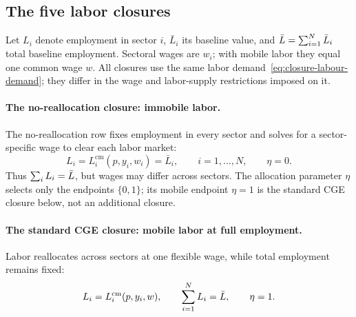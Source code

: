 \subsection{The five labor closures}\label{app:labour-closures}

Let $L_i$ denote employment in sector $i$, $\bar{L}_i$ its baseline value,
and $\bar{L} = \sum_{i=1}^N \bar{L}_i$ total baseline employment. Sectoral
wages are $w_i$; with mobile labor they equal one common wage $w$. All
closures use the same labor demand~\eqref{eq:closure-labour-demand}; they
differ in the wage and labor-supply restrictions imposed on it.

\paragraph{The no-reallocation closure: immobile labor.}
The no-reallocation row fixes employment in every sector and solves for a
sector-specific wage to clear each labor market:
\begin{equation}
L_i = L_i^{\mathrm{cm}}(p,y_i,w_i) = \bar{L}_i,
\qquad i=1,\ldots,N, \qquad \eta = 0.
\label{eq:closure-bf}
\end{equation}
Thus $\sum_i L_i = \bar{L}$, but wages may differ across sectors.
The allocation parameter $\eta$ selects only the endpoints $\{0,1\}$;
its mobile endpoint $\eta = 1$ is the standard CGE closure below, not an
additional closure.

\paragraph{The standard CGE closure: mobile labor at full employment.}
Labor reallocates across sectors at one flexible wage, while total
employment remains fixed:
\begin{equation}
L_i = L_i^{\mathrm{cm}}(p,y_i,w),
\qquad \sum_{i=1}^N L_i = \bar{L},
\qquad \eta = 1.
\label{eq:closure-alpha}
\end{equation}


